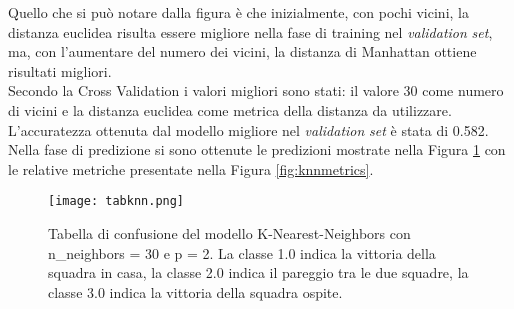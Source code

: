Quello che si può notare dalla figura è che inizialmente, con pochi vicini, la distanza euclidea risulta essere migliore nella fase di training nel \emph{validation} \emph{set}, ma, con l'aumentare del numero dei vicini, la distanza di Manhattan ottiene risultati migliori. \\
Secondo la Cross Validation i valori migliori sono stati: il valore 30 come numero di vicini e la distanza euclidea come metrica della distanza da utilizzare. L'accuratezza ottenuta dal modello migliore nel \emph{validation} \emph{set} è stata di 0.582.\\
Nella fase di predizione si sono ottenute le predizioni mostrate nella Figura \ref{fig:knnpre} con le relative metriche presentate nella Figura \ref{fig:knnmetrics}.

\begin{figure}[h]
	\begin{center}
		\texttt{[image: tabknn.png]}
		\caption{Tabella di confusione del modello K-Nearest-Neighbors con\textsf{ n\_neighbors} = 30 e \textsf{p} = 2. La classe 1.0 indica la vittoria della squadra in casa, la classe 2.0 indica il pareggio tra le due squadre, la classe 3.0 indica la vittoria della squadra ospite.
		} 
		\label{fig:knnpre}
	\end{center}
\end{figure}

